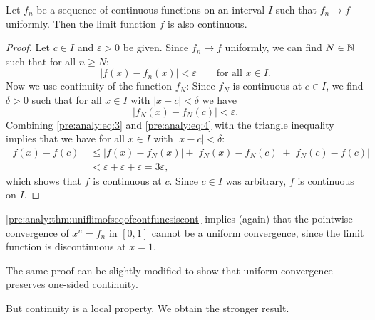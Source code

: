 \documentclass[10pt, a4paper]{article}
\begin{document}
\begin{theorem}\label{pre:analy:thm:uniflimofseqofcontfuncsiscont}
    Let $f_n$ be a sequence of continuous functions on an interval $I$ such that $f_n \rightarrow f$ uniformly.
    Then the limit function $f$ is also continuous.
    \begin{proof}
        Let $c \in I$ and $\varepsilon > 0$ be given.
        Since $f_n \rightarrow f$ uniformly,
        we can find $N \in \mathbb{N}$ such that for all $n \geq N$:
        \begin{equation}\label{pre:analy:eq:3}
            |f(x) - f_n(x)| < \varepsilon\qquad\text{for all } x \in I.
        \end{equation}
        Now we use continuity of the function $f_N$:
        Since $f_N$ is continuous at $c \in I$,
        we find $\delta > 0$ such that for all $x \in I$ with $|x - c| < \delta$ we have
        \begin{equation}\label{pre:analy:eq:4}
            |f_N(x) - f_N(c)| < \varepsilon.
        \end{equation}
        Combining \eqref{pre:analy:eq:3} and \eqref{pre:analy:eq:4} with the triangle inequality implies that we have for all $x \in I$ with $|x - c| < \delta$:
        \begin{align*}
            |f(x) - f(c)| &\leq |f(x) - f_N(x)| + |f_N(x) - f_N(c)| + |f_N(c) - f(c)| \\
            &< \varepsilon + \varepsilon + \varepsilon = 3\varepsilon,
        \end{align*}
        which shows that $f$ is continuous at $c$.
        Since $c \in I$ was arbitrary,
        $f$ is continuous on $I$.
    \end{proof}
\end{theorem}

\begin{remark}
    \autoref{pre:analy:thm:uniflimofseqofcontfuncsiscont} implies
    (again)
    that the pointwise convergence of $x ^ n = f_n$ in $[0, 1]$ cannot be a uniform convergence,
    since the limit function is discontinuous at $x = 1$.
\end{remark}

\begin{remark}
    The same proof can be slightly modified to show that uniform convergence preserves one-sided continuity.
\end{remark}

But continuity is a local property.
We obtain the stronger result.
\end{document}
